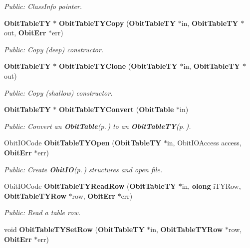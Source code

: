 \begin{CompactItemize}
\begin{CompactList}\small\item\em Public: Class\-Info pointer. \item\end{CompactList}\item 
{\bf Obit\-Table\-TY} $\ast$ {\bf Obit\-Table\-TYCopy} ({\bf Obit\-Table\-TY} $\ast$in, {\bf Obit\-Table\-TY} $\ast$out, {\bf Obit\-Err} $\ast$err)
\begin{CompactList}\small\item\em Public: Copy (deep) constructor. \item\end{CompactList}\item 
{\bf Obit\-Table\-TY} $\ast$ {\bf Obit\-Table\-TYClone} ({\bf Obit\-Table\-TY} $\ast$in, {\bf Obit\-Table\-TY} $\ast$out)
\begin{CompactList}\small\item\em Public: Copy (shallow) constructor. \item\end{CompactList}\item 
{\bf Obit\-Table\-TY} $\ast$ {\bf Obit\-Table\-TYConvert} ({\bf Obit\-Table} $\ast$in)
\begin{CompactList}\small\item\em Public: Convert an {\bf Obit\-Table}{\rm (p.\,\pageref{structObitTable})} to an {\bf Obit\-Table\-TY}{\rm (p.\,\pageref{structObitTableTY})}. \item\end{CompactList}\item 
Obit\-IOCode {\bf Obit\-Table\-TYOpen} ({\bf Obit\-Table\-TY} $\ast$in, Obit\-IOAccess access, {\bf Obit\-Err} $\ast$err)
\begin{CompactList}\small\item\em Public: Create {\bf Obit\-IO}{\rm (p.\,\pageref{structObitIO})} structures and open file. \item\end{CompactList}\item 
Obit\-IOCode {\bf Obit\-Table\-TYRead\-Row} ({\bf Obit\-Table\-TY} $\ast$in, {\bf olong} i\-TYRow, {\bf Obit\-Table\-TYRow} $\ast$row, {\bf Obit\-Err} $\ast$err)
\begin{CompactList}\small\item\em Public: Read a table row. \item\end{CompactList}\item 
void {\bf Obit\-Table\-TYSet\-Row} ({\bf Obit\-Table\-TY} $\ast$in, {\bf Obit\-Table\-TYRow} $\ast$row, {\bf Obit\-Err} $\ast$err)

\end{CompactItemize}
